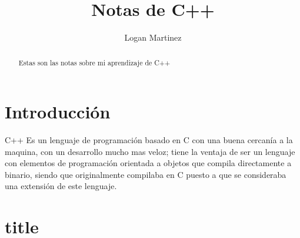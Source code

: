 \documentclass[]{article}
\title{Notas de C++}
\author{Logan Martinez}
\begin{document}
	
	\maketitle
	
	\begin{abstract}
		Estas son las notas sobre mi aprendizaje de C++
	\end{abstract}

	\section{Introducción}
	C++ Es un lenguaje de programación basado en C con una buena cercanía a la maquina, con un desarrollo mucho mas veloz; tiene la ventaja de ser un lenguaje con elementos de programación orientada a objetos que compila directamente a binario, siendo que originalmente compilaba en C puesto a que se consideraba una extensión de este lenguaje.
	
	\section{title}
\end{document}
